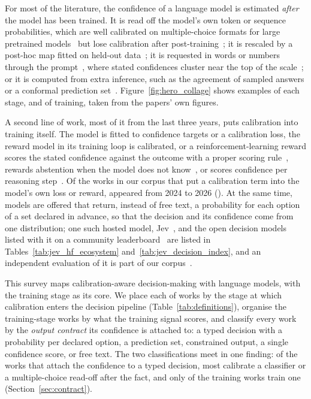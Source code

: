 For most of the literature, the confidence of a language model is estimated \emph{after} the model has been
trained. It is
read off the model's own token or sequence probabilities, which are well calibrated on multiple-choice
formats for large pretrained models~\citep{kadavath2022language} but lose calibration after
post-training~\citep{openai2023gpt4}; it is rescaled by a post-hoc map fitted on held-out
data~\citep{guo2017calibration}; it is requested in words or numbers through the
prompt~\citep{tian2023just}, where stated confidences cluster near the top of the
scale~\citep{xiong2023can}; or it is computed from extra inference, such as the agreement of sampled
answers or a conformal prediction set~\citep{farquhar2024semantic,campos2024conformal}.
Figure~\ref{fig:hero_collage} shows examples of each stage, and of training, taken from the papers' own figures.


A second line of work, most of it from the last three years, puts calibration into training itself. The
model is fitted to confidence targets or a calibration loss, the reward model in its training loop is
calibrated, or a reinforcement-learning reward scores the stated confidence against the outcome with a
proper scoring rule~\citep{baniharouni2025rewarding,damani2025beyond}, rewards abstention when the
model does not know~\citep{wei2025truthrl}, or scores confidence per reasoning
step~\citep{wang2026process}. Of the \nCore works in our corpus that put a calibration term into the
model's own loss or reward, \nCoreRecent appeared from 2024 to 2026 (\nCoreRecentPct). At the same
time, models are offered that return, instead of free text, a probability for each option of a set
declared in advance, so that the decision and its confidence come from one distribution; one such
hosted model, Jev~\citep{almeida2026introducing}, and the open decision models listed with it on a community
leaderboard~\citep{multimodalart2026jevdi} are listed in Tables~\ref{tab:jev_hf_ecosystem} and~\ref{tab:jev_decision_index}, and an independent evaluation of it is part of our
corpus~\citep{li2026jev}.




This survey maps calibration-aware decision-making with language models, with the training stage as
its core. We place each of \nWorks works by the stage at which calibration enters the decision
pipeline (Table~\ref{tab:definitions}), organise the \nCore training-stage works by what the training
signal scores, and classify every work by the \emph{output contract} its confidence is attached to:
a typed decision with a probability per declared option, a prediction set, constrained output, a single
confidence score, or free text. The two classifications meet in one finding: of the \nContractTyped works
that attach the confidence to a typed decision, most calibrate a classifier or a multiple-choice
read-off after the fact, and only \nCoreTyped of the \nCore training works train one
(Section~\ref{sec:contract}).

